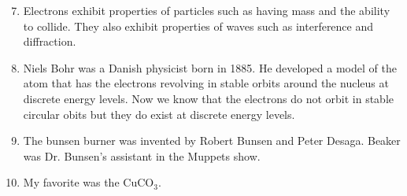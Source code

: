 \documentclass[12pt]{article}
\begin{document}
    \begin{enumerate}
        \setcounter{enumi}{6}
        \item Electrons exhibit properties of particles such as having mass and the ability to collide. They also exhibit properties of waves such as interference and diffraction.
        \item Niels Bohr was a Danish physicist born in 1885. He developed a model of the atom that has the electrons revolving in stable orbits around the nucleus at discrete energy levels. Now we know that the electrons do not orbit in stable circular obits but they do exist at discrete energy levels.
        \item The bunsen burner was invented by Robert Bunsen and Peter Desaga. Beaker was Dr. Bunsen's assistant in the Muppets show.
        \item My favorite was the CuCO\(_3\).
    \end{enumerate}
\end{document}
